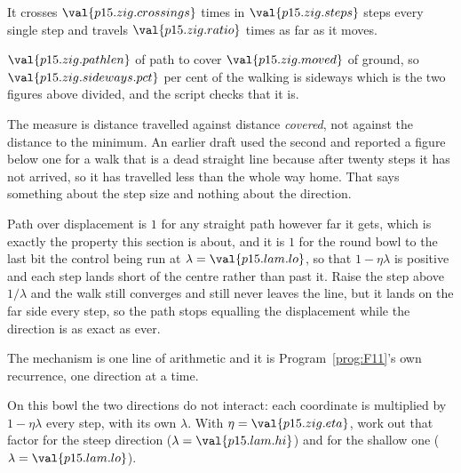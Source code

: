 \begin{fr}
\begin{ansblock}
It crosses $\val{p15.zig.crossings}$ times in $\val{p15.zig.steps}$ steps
\dash{} every single step \dash{} and travels $\val{p15.zig.ratio}$ times as
far as it moves.
\end{ansblock}

$\val{p15.zig.pathlen}$ of path to cover $\val{p15.zig.moved}$ of ground, so
$\val{p15.zig.sideways.pct}$ per cent of the walking is sideways \dash{} which
is the two figures above divided, and the script checks that it is.

\begin{note}
The measure is distance travelled against distance \emph{covered}, not against
the distance to the minimum. An earlier draft used the second and reported a
figure below one for a walk that is a dead straight line \dash{} because after
twenty steps it has not arrived, so it has travelled less than the whole way
home. That says something about the step size and nothing about the direction.

Path over displacement is $1$ for any straight path however far it gets, which
is exactly the property this section is about, and it is $1$ for the round bowl
to the last bit \dash{} the control being run at
$\lambda = \val{p15.lam.lo}$, so that $1 - \eta\lambda$ is positive and each
step lands short of the centre rather than past it. Raise the step above
$1/\lambda$ and the walk still converges and still never leaves the line, but
it lands on the far side every step, so the path stops equalling the
displacement while the direction is as exact as ever.
\end{note}
\end{fr}

\begin{fr}
The mechanism is one line of arithmetic and it is Program~\ref{prog:F11}'s own
recurrence, one direction at a time.

On this bowl the two directions do not interact: each coordinate is multiplied
by $1 - \eta\lambda$ every step, with its own $\lambda$. With
$\eta = \val{p15.zig.eta}$, work out that factor for the steep direction
($\lambda = \val{p15.lam.hi}$) and for the shallow one
($\lambda = \val{p15.lam.lo}$).
\dotline
\nextframe
\end{fr}

